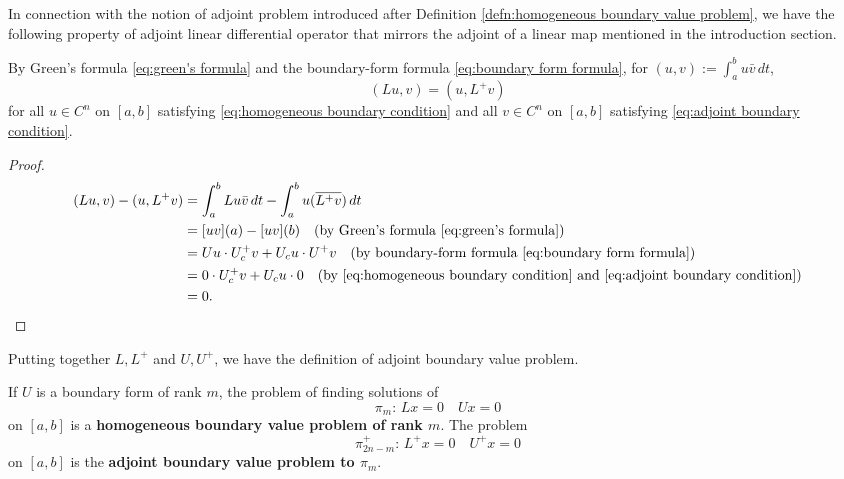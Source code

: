 \documentclass[11pt, oneside, a4paper]{article}
\begin{document}
In connection with the notion of adjoint problem introduced after Definition \ref{defn:homogeneous boundary value problem}, we have the following property of adjoint linear differential operator that mirrors the adjoint of a linear map mentioned in the introduction section.

\begin{prop}\label{prop:(Lu,v)=(u,L^+v)}
    By Green's formula \eqref{eq:green's formula} and the boundary-form formula \eqref{eq:boundary form formula}, for $(u,v):=\int_a^b u\bar{v}\,dt$, 
    \[(Lu, v) = (u, L^+v)\]
    for all $u\in C^n$ on $[a,b]$ satisfying \eqref{eq:homogeneous boundary condition} and all $v\in C^n$ on $[a,b]$ satisfying \eqref{eq:adjoint boundary condition}.
\end{prop}
\begin{proof}
    \begin{equation}
        \begin{split}
            (Lu, v) - (u, L^+v) &= \int_a^b Lu\bar{v}\,dt - \int_a^b u(\overline{L^+v})\,dt\\
            &= [uv](a) - [uv](b) \quad\mbox{(by Green's formula \eqref{eq:green's formula})}\\
            &= Uu\cdot U_c^+ v + U_c u\cdot U^+v \quad\mbox{(by boundary-form formula \eqref{eq:boundary form formula})}\\
            &= 0\cdot U_c^+ v + U_c u \cdot 0 \quad\mbox{(by \eqref{eq:homogeneous boundary condition} and \eqref{eq:adjoint boundary condition})}\\
            &= 0.\qedhere
        \end{split}
    \end{equation}
\end{proof}

Putting together $L, L^+$ and $U, U^+$, we have the definition of adjoint boundary value problem.

\begin{defn}\label{defn:adjoint boundary value problem}
    If $U$ is a boundary form of rank $m$, the problem of finding solutions of
    \[\pi_m:\,Lx=0\quad Ux=0\]
    on $[a,b]$ is a \textbf{homogeneous boundary value problem of rank $m$}. The problem
    \[\pi_{2n-m}^+:\,L^+x=0\quad U^+x=0\]
    on $[a,b]$ is the \textbf{adjoint boundary value problem to $\pi_m$}.
\end{defn}
\end{document}

